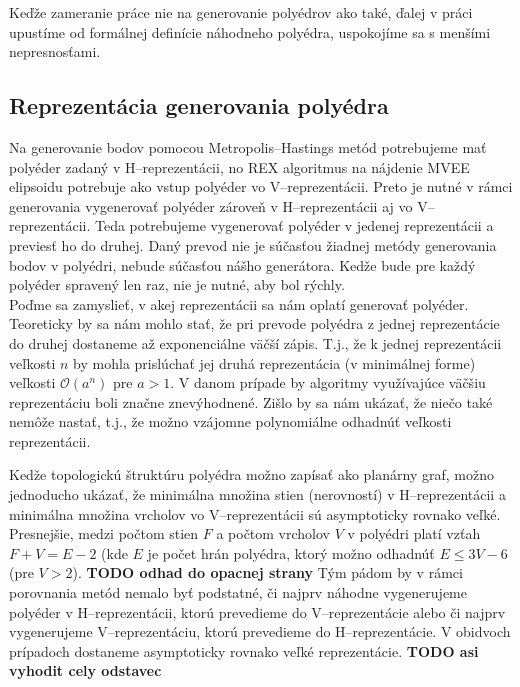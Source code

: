 Keďže zameranie práce nie na generovanie polyédrov ako také, ďalej v práci upustíme od formálnej definície náhodneho polyédra, uspokojíme sa s menšími nepresnosťami.\\

\subsection{Reprezentácia generovania polyédra}
Na generovanie bodov pomocou Metropolis--Hastings metód potrebujeme mať polyéder zadaný v H--reprezentácii, no REX algoritmus na nájdenie MVEE elipsoidu potrebuje ako vstup polyéder vo V--reprezentácii. Preto je nutné v rámci generovania vygenerovať polyéder zároveň v H--reprezentácii aj vo V--reprezentácii. Teda potrebujeme vygenerovať polyéder v jedenej reprezentácii a previesť ho do druhej. Daný prevod nie je súčasťou žiadnej metódy generovania bodov v polyédri, nebude súčasťou nášho generátora. Kedže bude pre každý polyéder spravený len raz, nie je nutné, aby bol rýchly.\\


Poďme sa zamyslieť, v akej reprezentácii sa nám oplatí generovať polyéder. Teoreticky by sa nám mohlo stať, že pri prevode polyédra z jednej reprezentácie do druhej dostaneme až exponenciálne väčší zápis. T.j., že k jednej reprezentácii veľkosti $n$ by mohla prislúchať jej druhá reprezentácia (v minimálnej forme) veľkosti $\mathcal O(a^n)$ pre $a>1$. V danom prípade by algoritmy využívajúce väčšiu reprezentáciu boli značne znevýhodnené. Zišlo by sa nám ukázať, že niečo také nemôže nastať, t.j., že možno vzájomne polynomiálne odhadnúť veľkosti reprezentácii.

Kedže topologickú štruktúru polyédra možno zapísať ako planárny graf, možno jednoducho ukázať, že minimálna množina stien (nerovností) v H--reprezentácii a minimálna množina vrcholov vo V--reprezentácii sú asymptoticky rovnako veľké.
Presnejšie, medzi počtom stien $F$ a počtom vrcholov $V$ v polyédri platí vzťah $F+V=E-2$ (kde $E$ je počet hrán polyédra, ktorý možno odhadnúť $E \le 3V-6$ (pre $V>2$). \textbf{TODO odhad do opacnej strany}
Tým pádom by v rámci porovnania metód nemalo byť podstatné, či najprv náhodne vygenerujeme polyéder v H--reprezentácii, ktorú prevedieme do V--reprezentácie alebo či najprv vygenerujeme V--reprezentáciu, ktorú prevedieme do H--reprezentácie. V obidvoch prípadoch dostaneme asymptoticky rovnako veľké reprezentácie.
\textbf{TODO asi vyhodit cely odstavec}\\

